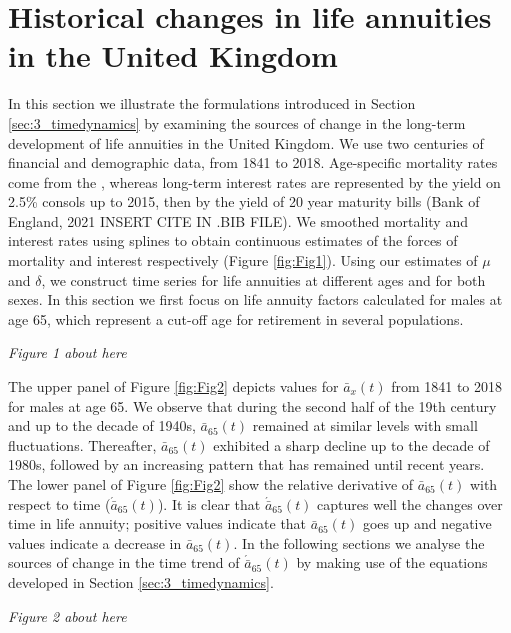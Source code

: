 \documentclass[12pt]{article}
\begin{document}
\section{Historical changes in life annuities in the United Kingdom}\label{sec:4_Illustration}

In this section we illustrate the formulations introduced in Section \ref{sec:3_timedynamics} by examining the sources of change in the long-term development of life annuities in the United Kingdom. We use two centuries of financial and demographic data, from 1841 to 2018. Age-specific mortality rates come from the \citep{HMD2020}, whereas long-term interest rates are represented by the yield on 2.5\% consols up to 2015, then by the yield of 20 year maturity bills (Bank of England, 2021 INSERT CITE IN .BIB FILE). We smoothed mortality and interest rates using splines \citep{green1993nonparametric,camarda2012mortalitysmooth} to obtain continuous estimates of the forces of mortality and interest respectively (Figure \ref{fig:Fig1}). Using our estimates of $\mu$ and $\delta$, we construct time series for life annuities at different ages and for both sexes. In this section we first focus on life annuity factors calculated for males at age 65, which represent a cut-off age for retirement in several populations. 


\begin{center}
	\textit{Figure 1 about here}
\end{center}




The upper panel of Figure \ref{fig:Fig2} depicts values for $\bar{a}_x(t)$ from 1841 to 2018 for males at age 65. We observe that during the second half of the 19th century and up to the decade of 1940s, $\bar{a}_{65}(t)$ remained at similar levels with small fluctuations. Thereafter, $\bar{a}_{65}(t)$ exhibited a sharp decline up to the decade of 1980s, followed by an increasing pattern that has remained until recent years. The lower panel of Figure \ref{fig:Fig2} show the relative derivative of $\bar{a}_{65}(t)$ with respect to time ($\acute{\bar{a}}_{65}(t)$). It is clear that $\acute{\bar{a}}_{65}(t)$ captures well the changes over time in life annuity; positive values indicate that $\bar{a}_{65}(t)$ goes up and negative values indicate a decrease in $\bar{a}_{65}(t)$. In the following sections we analyse the sources of change in the time trend of $\acute{\bar{a}}_{65}(t)$ by making use of the equations developed in Section \ref{sec:3_timedynamics}.

 
  \begin{center}
  	\textit{Figure 2 about here}
  \end{center}
  
\end{document}
